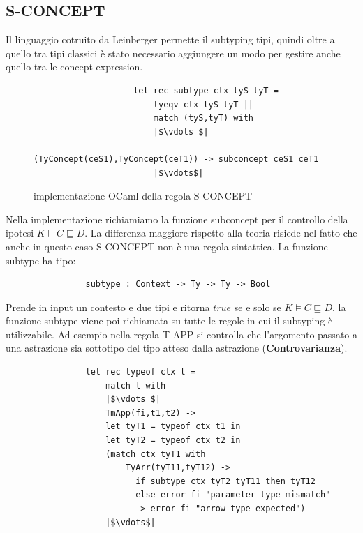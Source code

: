             \subsection{S-CONCEPT}
            Il linguaggio cotruito da Leinberger permette il subtyping tipi, quindi oltre a quello tra tipi classici è stato necessario aggiungere un modo per gestire
            anche quello tra le concept expression.
            \begin{figure}[h] 
                \begin{verbatim}
                    let rec subtype ctx tyS tyT =
                        tyeqv ctx tyS tyT ||
                        match (tyS,tyT) with
                        |$\vdots $|
                            (TyConcept(ceS1),TyConcept(ceT1)) -> subconcept ceS1 ceT1
                        |$\vdots$|
                \end{verbatim}
            \caption{implementazione OCaml della regola S-CONCEPT}
            \end{figure}
            Nella implementazione richiamiamo la funzione subconcept per il controllo della ipotesi $K \vDash C \sqsubseteq D$. La differenza maggiore rispetto alla teoria
            risiede nel fatto che anche in questo caso S-CONCEPT non è una regola sintattica. La funzione subtype ha tipo:
            \begin{verbatim}
                subtype : Context -> Ty -> Ty -> Bool
            \end{verbatim}
            Prende in input un contesto e due tipi e ritorna $true$ se e solo se $K \vDash C \sqsubseteq D$. la funzione subtype viene poi richiamata su tutte le regole
            in cui il subtyping è utilizzabile. Ad esempio nella regola T-APP si controlla che l'argomento passato a una astrazione sia sottotipo del tipo atteso dalla astrazione (\textbf{Controvarianza}).
            \begin{verbatim}
                let rec typeof ctx t =
                    match t with
                    |$\vdots $|
                    TmApp(fi,t1,t2) ->
                    let tyT1 = typeof ctx t1 in
                    let tyT2 = typeof ctx t2 in
                    (match ctx tyT1 with
                        TyArr(tyT11,tyT12) ->
                          if subtype ctx tyT2 tyT11 then tyT12
                          else error fi "parameter type mismatch"
                        _ -> error fi "arrow type expected")
                    |$\vdots$|
            \end{verbatim}
            











        
        